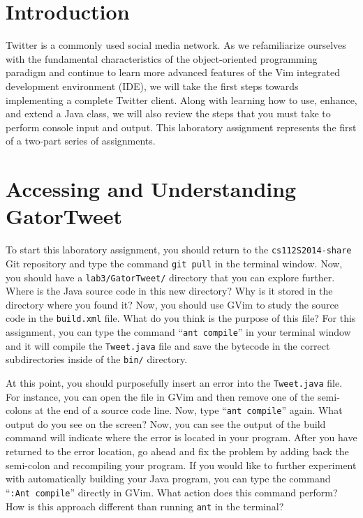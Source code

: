


\usepackage[compact]{titlesec}


\section*{Introduction}

  Twitter is a commonly used social media network.  As we refamiliarize ourselves with the fundamental characteristics
  of the object-oriented programming paradigm and continue to learn more advanced features of the Vim integrated
  development environment (IDE), we will take the first steps towards implementing a complete Twitter client. Along with
  learning how to use, enhance, and extend a Java class, we will also review the steps that you must take to perform
  console input and output. This laboratory assignment represents the first of a two-part series of assignments. 

\section*{Accessing and Understanding GatorTweet}

  To start this laboratory assignment, you should return to the {\tt cs112S2014-share} Git repository and type the
  command {\tt git pull} in the terminal window.  Now, you should have a {\tt lab3/GatorTweet/} directory that you can
  explore further.  Where is the Java source code in this new directory? Why is it stored in the directory where you
  found it? Now, you should use GVim to study the source code in the {\tt build.xml} file.  What do you think is the
  purpose of this file?  For this assignment, you can type the command ``{\tt ant compile}'' in your terminal window and
  it will compile the {\tt Tweet.java} file and save the bytecode in the correct subdirectories inside of the {\tt bin/}
  directory. 

  At this point, you should purposefully insert an error into the {\tt Tweet.java} file.  For instance, you can open the
  file in GVim and then remove one of the semi-colons at the end of a source code line. Now, type ``{\tt ant compile}''
  again.  What output do you see on the screen? Now, you can see the output of the build command will indicate where the
  error is located in your program. After you have returned to the error location, go ahead and fix the problem by
  adding back the semi-colon and recompiling your program. If you would like to further experiment with automatically
  building your Java program, you can type the command ``{\tt :Ant compile}'' directly in GVim. What action does this
  command perform? How is this approach different than running {\tt ant} in the terminal?

